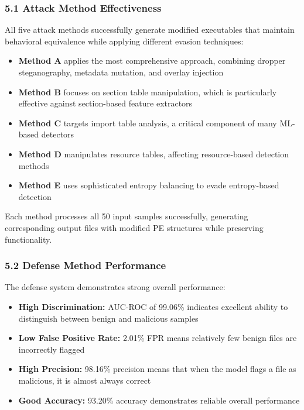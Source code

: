\documentclass[12pt,letterpaper]{article}
\begin{document}
\subsubsection*{5.1 Attack Method Effectiveness}

All five attack methods successfully generate modified executables that maintain behavioral equivalence while applying different evasion techniques:

\begin{itemize}
    \item \textbf{Method A} applies the most comprehensive approach, combining dropper steganography, metadata mutation, and overlay injection
    \item \textbf{Method B} focuses on section table manipulation, which is particularly effective against section-based feature extractors
    \item \textbf{Method C} targets import table analysis, a critical component of many ML-based detectors
    \item \textbf{Method D} manipulates resource tables, affecting resource-based detection methods
    \item \textbf{Method E} uses sophisticated entropy balancing to evade entropy-based detection
\end{itemize}

Each method processes all 50 input samples successfully, generating corresponding output files with modified PE structures while preserving functionality.

\subsubsection*{5.2 Defense Method Performance}

The defense system demonstrates strong overall performance:

\begin{itemize}
    \item \textbf{High Discrimination:} AUC-ROC of 99.06\% indicates excellent ability to distinguish between benign and malicious samples
    \item \textbf{Low False Positive Rate:} 2.01\% FPR means relatively few benign files are incorrectly flagged
    \item \textbf{High Precision:} 98.16\% precision means that when the model flags a file as malicious, it is almost always correct
    \item \textbf{Good Accuracy:} 93.20\% accuracy demonstrates reliable overall performance
\end{itemize}
\end{document}
